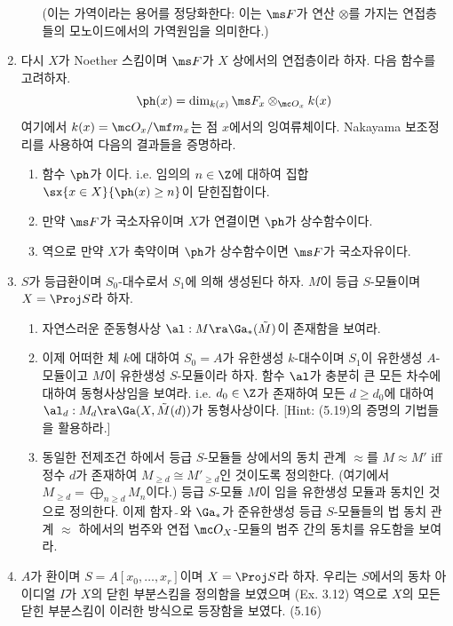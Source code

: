\begin{enumerate}[label=\tb{5.\arabic*.},itemindent=0mm,itemsep=2mm]
\begin{enumerate}[label=(\alph*)]
	(이는 가역이라는 용어를 정당화한다: 이는 $\ms F$가 연산 $\otimes$를 가지는 연접층들의 모노이드에서의 가역원임을 의미한다.)
	\end{enumerate}
	\item 다시 $X$가 Noether 스킴이며 $\ms F$가 $X$ 상에서의 연접층이라 하자. 다음 함수를 고려하자.
	$$\ph(x)=\dim_{k(x)}\ms F_x\otimes_{\mc O_x}k(x)$$
	여기에서 $k(x)=\mc O_x/\mf m_x$는 점 $x$에서의 잉여류체이다. Nakayama 보조정리를 사용하여 다음의 결과들을 증명하라.
	\begin{enumerate}[label=(\alph*)]
	\item 함수 $\ph$가 이다.
	i.e. 임의의 $n\in\Z$에 대하여 집합 $\sx{x\in X}{\ph(x)\ge n}$이 닫힌집합이다.
	\item 만약 $\ms F$가 국소자유이며 $X$가 연결이면 $\ph$가 상수함수이다.
	\item 역으로 만약 $X$가 축약이며 $\ph$가 상수함수이면 $\ms F$가 국소자유이다.
	\end{enumerate}
	\item $S$가 등급환이며 $S_0$-대수로서 $S_1$에 의해 생성된다 하자. $M$이 등급 $S$-모듈이며 $X=\Proj S$라 하자.
	\begin{enumerate}[label=(\alph*)]
	\item 자연스러운 준동형사상 $\al:M\ra\Ga_*(\tilde M)$이 존재함을 보여라.
	\item 이제 어떠한 체 $k$에 대하여 $S_0=A$가 유한생성 $k$-대수이며 $S_1$이 유한생성 $A$-모듈이고 $M$이 유한생성 $S$-모듈이라 하자.
	함수 $\al$가 충분히 큰 모든 차수에 대하여 동형사상임을 보여라.
	i.e. $d_0\in\Z$가 존재하여 모든 $d\ge d_0$에 대하여 $\al_d:M_d\ra\Ga(X,\tilde M(d))$가 동형사상이다.
	[Hint: (5.19)의 증명의 기법들을 활용하라.]
	\item 동일한 전제조건 하에서 등급 $S$-모듈들 상에서의 동치 관계 $\approx$를 $M\approx M'$ iff
	정수 $d$가 존재하여 $M_{\ge d}\cong M'_{\ge d}$인 것이도록 정의한다. (여기에서 $M_{\ge d}=\bigoplus_{n\ge d}M_n$이다.)
	등급 $S$-모듈 $M$이 임을 유한생성 모듈과 동치인 것으로 정의한다.
	이제 함자 $\tilde{\;}$와 $\Ga_*$가 준유한생성 등급 $S$-모듈들의 법 동치 관계 $\approx$ 하에서의 범주와
	연접 $\mc O_X$-모듈의 범주 간의 동치를 유도함을 보여라.
	\end{enumerate}
	\item $A$가 환이며 $S=A[x_0,\ldots,x_r]$이며 $X=\Proj S$라 하자. 우리는 $S$에서의 동차 아이디얼 $I$가
	$X$의 닫힌 부분스킴을 정의함을 보였으며 (Ex. 3.12) 역으로 $X$의 모든 닫힌 부분스킴이 이러한 방식으로 등장함을 보였다. (5.16)

\end{enumerate}
